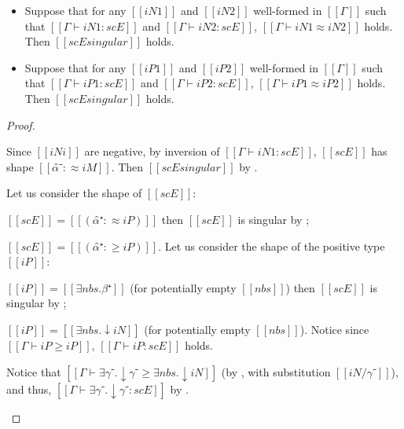\begin{lemma}
    \label{lemma:entry-singularity-completeness}
    \begin{itemize}
        \item [$-$] Suppose that for any $[[iN1]]$ and $[[iN2]]$ well-formed in $[[Γ]]$
            such that $[[Γ ⊢ iN1 : scE]]$ and $[[Γ ⊢ iN2 : scE]]$,
            $[[Γ ⊢ iN1 ≈ iN2]]$ holds. Then $[[scE singular]]$ holds.
        \item [$+$] Suppose that for any $[[iP1]]$ and $[[iP2]]$ well-formed in $[[Γ]]$
            such that $[[Γ ⊢ iP1 : scE]]$ and $[[Γ ⊢ iP2 : scE]]$,
            $[[Γ ⊢ iP1 ≈ iP2]]$ holds. Then $[[scE singular]]$ holds.
    \end{itemize}
\end{lemma}
\begin{proof}
    \begin{itemize}
        \item [$-$] Since $[[iNi]]$ are negative, by inversion of
            $[[Γ ⊢ iN1 : scE]]$, $[[scE]]$ has shape $[[α̂⁻ :≈ iM]]$.
            Then $[[scE singular]]$ by .
        \item [$+$]
            Let us consider the shape of $[[scE]]$:
            \begin{caseof}
                \item $[[scE]] = [[(α̂⁺ :≈ iP)]]$ then $[[scE]]$ is 
                    singular by ;
                \item $[[scE]] = [[(α̂⁺ :≥ iP)]]$. Let us consider the shape 
                    of the positive type $[[iP]]$:
                    \begin{caseof}
                        \item $[[iP]] = [[∃nbs.β⁺]]$ (for potentially empty $[[nbs]]$) then
                            $[[scE]]$ is singular by ;
                        \item $[[iP]] = [[∃nbs.↓iN]]$ (for potentially empty $[[nbs]]$).
                            Notice since $[[Γ ⊢ iP ≥ iP]]$, $[[Γ ⊢ iP : scE]]$ holds. 

                            Notice that $[[Γ ⊢ ∃γ⁻.↓γ⁻ ≥ ∃nbs.↓iN]]$ 
                            (by , 
                            with substitution $[[iN / γ⁻]]$), and thus, 
                            $[[Γ ⊢ ∃γ⁻.↓γ⁻ : scE]]$ by .


\end{caseof}
\end{caseof}
\end{itemize}
\end{proof}
